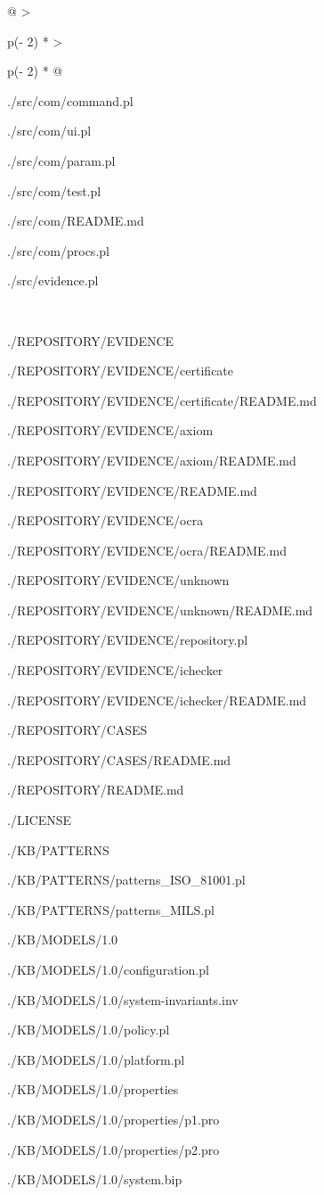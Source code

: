 \documentclass[12pt,twoside,a4paper]{article}
\begin{document}
\begin{longtable}[]{@{}
  >{\raggedright\arraybackslash}p{(\columnwidth - 2\tabcolsep) * }
  >{\raggedright\arraybackslash}p{(\columnwidth - 2\tabcolsep) * }@{}}
\begin{minipage}[b]{\linewidth}
./src/com/command.pl

./src/com/ui.pl

./src/com/param.pl

./src/com/test.pl

./src/com/README.md

./src/com/procs.pl

./src/evidence.pl\strut
\end{minipage} \\
\midrule
\endfirsthead
\toprule
\begin{minipage}[b]{\linewidth}\raggedright
./REPOSITORY/EVIDENCE

./REPOSITORY/EVIDENCE/certificate

./REPOSITORY/EVIDENCE/certificate/README.md

./REPOSITORY/EVIDENCE/axiom

./REPOSITORY/EVIDENCE/axiom/README.md

./REPOSITORY/EVIDENCE/README.md

./REPOSITORY/EVIDENCE/ocra

./REPOSITORY/EVIDENCE/ocra/README.md

./REPOSITORY/EVIDENCE/unknown

./REPOSITORY/EVIDENCE/unknown/README.md

./REPOSITORY/EVIDENCE/repository.pl

./REPOSITORY/EVIDENCE/ichecker

./REPOSITORY/EVIDENCE/ichecker/README.md

./REPOSITORY/CASES

./REPOSITORY/CASES/README.md

./REPOSITORY/README.md

./LICENSE

./KB/PATTERNS

./KB/PATTERNS/patterns\_ISO\_81001.pl

./KB/PATTERNS/patterns\_MILS.pl

./KB/MODELS/1.0

./KB/MODELS/1.0/configuration.pl

./KB/MODELS/1.0/system-invariants.inv

./KB/MODELS/1.0/policy.pl

./KB/MODELS/1.0/platform.pl

./KB/MODELS/1.0/properties

./KB/MODELS/1.0/properties/p1.pro

./KB/MODELS/1.0/properties/p2.pro

./KB/MODELS/1.0/system.bip


\end{minipage}
\end{longtable}
\end{document}
